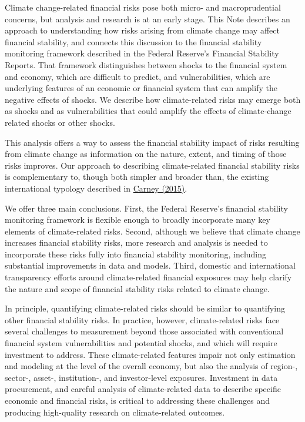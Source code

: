 \documentclass[
]{book}
\begin{document}
Climate change-related financial risks pose both micro- and macroprudential concerns, but analysis and research is at an early stage.
This Note describes an approach to understanding how risks arising from climate change may affect financial stability, and connects this discussion to the financial stability monitoring framework described in the Federal Reserve's Financial Stability Reports.
That framework distinguishes between shocks to the financial system and economy, which are difficult to predict, and vulnerabilities, which are underlying features of an economic or financial system that can amplify the negative effects of shocks.
We describe how climate-related risks may emerge both as shocks and as vulnerabilities that could amplify the effects of climate-change related shocks or other shocks.

This analysis offers a way to assess the financial stability impact of risks resulting from climate change as information on the nature, extent, and timing of those risks improves. Our approach to describing climate-related financial stability risks is complementary to, though both simpler and broader than, the existing international typology described in \href{https://www.bis.org/review/r151009a.pdf}{Carney (2015)}.

We offer three main conclusions. First, the Federal Reserve's financial stability monitoring framework is flexible enough to broadly incorporate many key elements of climate-related risks. Second, although we believe that climate change increases financial stability risks, more research and analysis is needed to incorporate these risks fully into financial stability monitoring, including substantial improvements in data and models. Third, domestic and international transparency efforts around climate-related financial exposures may help clarify the nature and scope of financial stability risks related to climate change.

In principle, quantifying climate-related risks should be similar to quantifying other financial stability risks. In practice, however, climate-related risks face several challenges to measurement beyond those associated with conventional financial system vulnerabilities and potential shocks, and which will require investment to address. These climate-related features impair not only estimation and modeling at the level of the overall economy, but also the analysis of region-, sector-, asset-, institution-, and investor-level exposures. Investment in data procurement, and careful analysis of climate-related data to describe specific economic and financial risks, is critical to addressing these challenges and producing high-quality research on climate-related outcomes.
\end{document}
